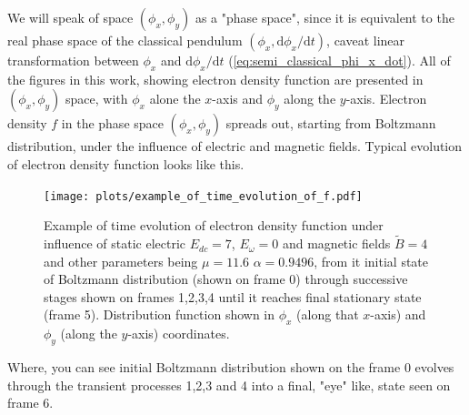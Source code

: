 \documentclass[40pt,letterpaper,physrev]{article}
\begin{document}
    We will speak of space $(\phi_x,\phi_y)$ as a "phase space", since it is equivalent to the real phase space of 
    the classical pendulum $(\phi_x,\text{d}\phi_x/\text{d}t)$, caveat linear transformation between $\phi_x$ and 
    $\text{d}\phi_x/\text{d}t$ (\ref{eq:semi_classical_phi_x_dot}). All of the figures in this work, showing electron 
    density function are presented in $(\phi_x,\phi_y)$ space, with $\phi_x$ alone the $x$-axis and $\phi_y$ along
    the $y$-axis. Electron density $f$ in the phase space $(\phi_x,\phi_y)$ spreads out, starting from Boltzmann 
    distribution, under the influence of electric and magnetic fields. Typical evolution of electron density function
    looks like this.
    \begin{figure}[H]
   	  \centering
	  \normalsize %
	  \texttt{[image: plots/example\_of\_time\_evolution\_of\_f.pdf]}
	  \label{fig:example_of_time_evolution_of_f}
	  \caption{Example of time evolution of electron density function under influence of static electric
	  $E_{dc}=7$, $E_{\omega}=0$ and magnetic fields $\tilde{B}=4$ and other parameters being $\mu=11.6$ 
	  $\alpha=0.9496$, from it initial state of Boltzmann distribution (shown on frame 0) through 
	  successive stages shown on frames 1,2,3,4 until it reaches final stationary state (frame 5). Distribution 
	  function shown in $\phi_x$ (along that $x$-axis) and $\phi_y$ (along the $y$-axis) coordinates.}
	\end{figure}
	Where, you can see initial Boltzmann distribution shown on the frame 0 evolves through the transient 
	processes 1,2,3 and 4 into a final, "eye" like, state seen on frame 6.
	
\end{document}
